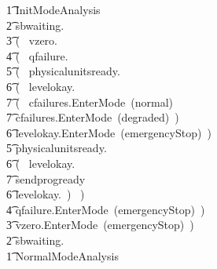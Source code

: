 \documentclass{report} %
\begin{document}
\begin{circus}
        \t1 InitModeAnalysis \circdef \\
            \t2 sbwaiting.\true \then \\
                \t3 (~ vzero.\true \then \\
                    \t4 (~ qfailure.\false \then \\
                        \t5 (~ physicalunitsready.\true \then \\
                                \t6 (~ levelokay.\true \then \\
                                    \t7 (~ cfailures.\false \then EnterMode~(normal) \extchoice \\
                                    \t7 cfailures.\true \then EnterMode~(degraded)~) \extchoice \\
                                 \t6  levelokay.\false \then EnterMode~(emergencyStop)~) \extchoice \\
                        \t5 physicalunitsready.\false \then \\
                                \t6 (~ levelokay.\true \then \\
                                    \t7 sendprogready \then \Skip \extchoice \\
                                \t6 levelokay.\false \then \Skip~) ~) \extchoice \\
                     \t4 qfailure.\true \then EnterMode~(emergencyStop)~) \extchoice \\
                \t3 vzero.\false \then EnterMode~(emergencyStop)~) \extchoice\\
            \t2 sbwaiting.\false \then \Skip \\
        \t1 NormalModeAnalysis \circdef \\

\end{circus}
\end{document}
